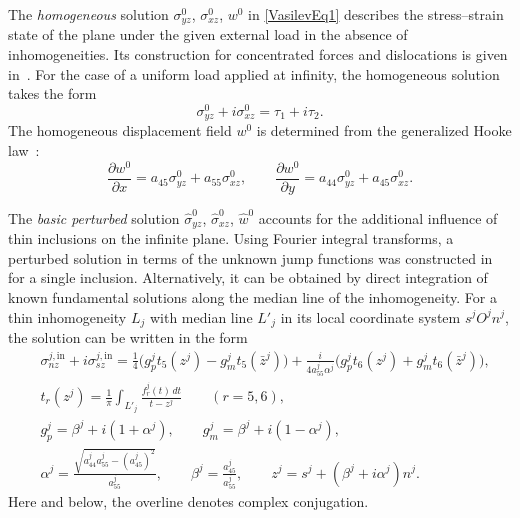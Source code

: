 The \emph{homogeneous} solution $\sigma_{yz}^{0}$, $\sigma_{xz}^{0}$, $w^{0}$ in \eqref{VasilevEq1} describes the stress--strain state of the plane under the given external load in the absence of inhomogeneities. Its construction for concentrated forces and dislocations is given in~\cite{Vasilev23,Vasilev25,Vasilev26}. For the case of a uniform load applied at infinity, the homogeneous solution takes the form
\begin{equation}
	\sigma_{yz}^{0}+i\sigma_{xz}^{0}=\tau_1+i\tau_2.
	\label{VasilevEq2}
\end{equation}
The homogeneous displacement field $w^{0}$ is determined from the generalized Hooke law~\cite{Vasilev25,Vasilev26}:
\begin{equation}
	\frac{\partial w^{0}}{\partial x}=a_{45}\sigma_{yz}^{0}+a_{55}\sigma_{xz}^{0},
	\qquad
	\frac{\partial w^{0}}{\partial y}=a_{44}\sigma_{yz}^{0}+a_{45}\sigma_{xz}^{0}.
	\label{VasilevEq3}
\end{equation}

The \emph{basic perturbed} solution $\widehat{\sigma}_{yz}^{0}$, $\widehat{\sigma}_{xz}^{0}$, $\widehat{w}^{0}$ accounts for the additional influence of thin inclusions on the infinite plane. Using Fourier integral transforms, a perturbed solution in terms of the unknown jump functions was constructed in~\cite{Vasilev23} for a single inclusion. Alternatively, it can be obtained by direct integration of known fundamental solutions along the median line of the inhomogeneity. For a thin inhomogeneity $L_j$ with median line $L'_j$ in its local coordinate system $s^jO^jn^j$, the solution can be written in the form~\cite{Vasilev27,Vasilev29}
\begin{equation}
	\begin{aligned}
		&\sigma_{nz}^{j,\mathrm{in}}+i\sigma_{sz}^{j,\mathrm{in}}
		=
		\frac{1}{4}\bigl(g_p^j t_5(z^j)-g_m^j t_5(\bar z^j)\bigr)
		+
		\frac{i}{4a_{55}^j\alpha^j}\bigl(g_p^j t_6(z^j)+g_m^j t_6(\bar z^j)\bigr),\\
		&t_r(z^j)
		=
		\frac{1}{\pi}\int_{L'_j}\frac{f_r^j(t)\,dt}{t-z^j}
		\qquad (r=5,6),\\
		&g_p^j=\beta^j+i(1+\alpha^j),
		\qquad
		g_m^j=\beta^j+i(1-\alpha^j),\\
		&\alpha^j
		=
		\frac{\sqrt{a_{44}^j a_{55}^j-(a_{45}^j)^2}}{a_{55}^j},
		\qquad
		\beta^j=\frac{a_{45}^j}{a_{55}^j},
		\qquad
		z^j=s^j+(\beta^j+i\alpha^j)n^j.
	\end{aligned}
	\label{VasilevEq4}
\end{equation}
Here and below, the overline denotes complex conjugation.

